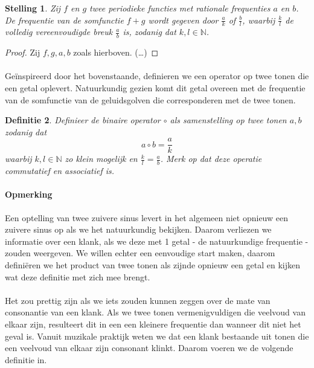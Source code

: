 \documentclass[a4paper]{article}
\newtheorem{st}{Stelling}
\newtheorem{dfn}[st]{Definitie}
\begin{document}
\begin{st}\label{somperiode}
	Zij $f$ en $g $ twee periodieke functies met rationale frequenties $a$ en $b$.
	De frequentie van de somfunctie $f+g$ wordt gegeven door $\frac{a}{k}$ of $\frac{b}{l}$, waarbij $\frac{k}{l}$ de volledig vereenvoudigde breuk $\frac{a}{b}$ is, zodanig dat $k,l \in \mathbb{N}$.
\end{st}
\begin{proof}
	Zij $f,g,a,b$ zoals hierboven. (\dots)
\end{proof}

\paragraph{}
Ge\"inspireerd door het bovenstaande, definieren we een operator op twee tonen die een getal oplevert.
Natuurkundig gezien komt dit getal overeen met de frequentie van de somfunctie van de geluidsgolven die corresponderen met de twee tonen.
	
\begin{dfn}
	Definieer de binaire operator $\circ$ als samenstelling op twee tonen $a,b$ zodanig dat
	\begin{equation}
		a\circ b = \frac{a}{k}
		\label{defsamenstelling}
	\end{equation}
	waarbij $k,l \in \mathbb{N} $ zo klein mogelijk en $ \frac{k}{l} = \frac{a}{b}$.
	Merk op dat deze operatie commutatief en associatief is.
\end{dfn}

\paragraph{Opmerking}
Een optelling van twee zuivere sinus levert in het algemeen niet opnieuw een zuivere sinus op als we het natuurkundig bekijken.
Daarom verliezen we informatie over een klank, als we deze met 1 getal - de natuurkundige frequentie - zouden weergeven.
We willen echter een eenvoudige start maken, daarom defini\"eren we het product van twee tonen als zijnde opnieuw een getal en kijken wat deze definitie met zich mee brengt.

\paragraph{}
Het zou prettig zijn als we iets zouden kunnen zeggen over de mate van consonantie van een klank.
Als we twee tonen vermenigvuldigen die veelvoud van elkaar zijn, resulteert dit in een een kleinere frequentie dan wanneer dit niet het geval is.
Vanuit muzikale praktijk weten we dat een klank bestaande uit tonen die een veelvoud van elkaar zijn consonant klinkt. 
Daarom voeren we de volgende definitie in.
\end{document}
